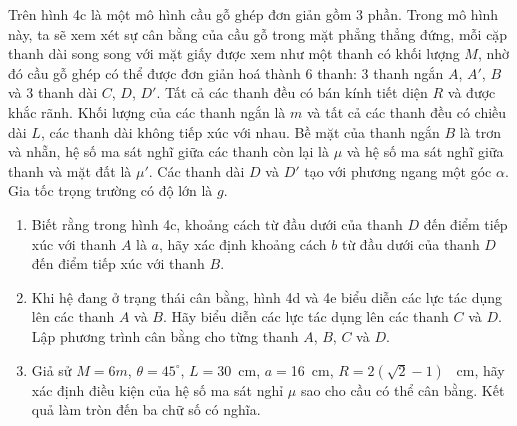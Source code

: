 \indent Trên hình 4c là một mô hình cầu gỗ ghép đơn giản gồm 3 phần. Trong mô hình này, ta sẽ xem xét sự cân bằng của cầu gỗ trong mặt phẳng thẳng đứng, mỗi cặp thanh dài song song với mặt giấy được xem như một thanh có khối lượng $M$, nhờ đó cầu gỗ ghép có thể được đơn giản hoá thành 6 thanh: 3 thanh ngắn $A$, $A'$, $B$ và 3 thanh dài $C$, $D$, $D'$. Tất cả các thanh đều có bán kính tiết diện $R$ và được khắc rãnh. Khối lượng của các thanh ngắn là $m$ và tất cả các thanh đều có chiều dài $L$, các thanh dài không tiếp xúc với nhau. Bề mặt của thanh ngắn $B$ là trơn và nhẵn, hệ số ma sát nghĩ giữa các thanh còn lại là $\mu$ và hệ số ma sát nghĩ giữa thanh và mặt đất là $\mu'$. Các thanh dài $D$ và $D'$ tạo với phương ngang một góc $\alpha$. Gia tốc trọng trường có độ lớn là $g$.\\
\vspace{-20px}
\begin{enumerate}
  \item Biết rằng trong hình 4c, khoảng cách từ đầu dưới của thanh $D$ đến điểm tiếp xúc với thanh $A$ là $a$, hãy xác định khoảng cách $b$ từ đầu dưới của thanh $D$ đến điểm tiếp xúc với thanh $B$.
  \item Khi hệ đang ở trạng thái cân bằng, hình 4d và 4e biểu diễn các lực tác dụng lên các thanh $A$ và $B$. Hãy biểu diễn các lực tác dụng lên các thanh $C$ và $D$. Lập phương trình cân bằng cho từng thanh $A$, $B$, $C$ và $D$.
  \item Giả sử $M=6m$, $\theta=45^{\circ}$, $L=$\SI{30}{\centi\metre}, $a=$\SI{16}{\centi\metre}, $R=2(\sqrt{2}-1)$ \SI{ }{\centi\metre}, hãy xác định điều kiện của hệ số ma sát nghỉ $\mu$ sao cho cầu có thể cân bằng. Kết quả làm tròn đến ba chữ số có nghĩa.
\end{enumerate}